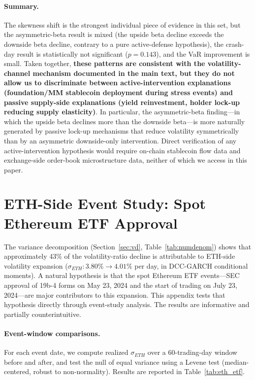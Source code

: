 \documentclass[11pt,a4paper]{article}
\begin{document}
\paragraph{Summary.} The skewness shift is the strongest individual piece of evidence in this set, but the asymmetric-beta result is mixed (the upside beta decline exceeds the downside beta decline, contrary to a pure active-defense hypothesis), the crash-day result is statistically not significant ($p=0.143$), and the VaR improvement is small. Taken together, \textbf{these patterns are consistent with the volatility-channel mechanism documented in the main text, but they do not allow us to discriminate between active-intervention explanations (foundation/MM stablecoin deployment during stress events) and passive supply-side explanations (yield reinvestment, holder lock-up reducing supply elasticity)}. In particular, the asymmetric-beta finding---in which the upside beta declines more than the downside beta---is more naturally generated by passive lock-up mechanisms that reduce volatility symmetrically than by an asymmetric downside-only intervention. Direct verification of any active-intervention hypothesis would require on-chain stablecoin flow data and exchange-side order-book microstructure data, neither of which we access in this paper.

\section{ETH-Side Event Study: Spot Ethereum ETF Approval} \label{app:eth_etf}

The variance decomposition (Section~\ref{sec:vd}, Table~\ref{tab:numdenom}) shows that approximately 43\% of the volatility-ratio decline is attributable to ETH-side volatility expansion ($\sigma_{ETH}: 3.80\% \to 4.01\%$ per day, in DCC-GARCH conditional moments). A natural hypothesis is that the spot Ethereum ETF events---SEC approval of 19b-4 forms on May 23, 2024 and the start of trading on July 23, 2024---are major contributors to this expansion. This appendix tests that hypothesis directly through event-study analysis. The results are informative and partially counterintuitive.

\paragraph{Event-window comparisons.} For each event date, we compute realized $\sigma_{ETH}$ over a 60-trading-day window before and after, and test the null of equal variance using a Levene test (median-centered, robust to non-normality). Results are reported in Table~\ref{tab:eth_etf}.
\end{document}
